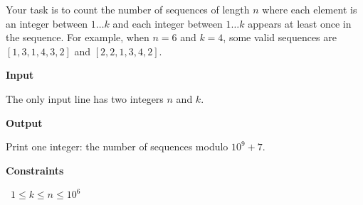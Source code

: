 Your task is to count the number of sequences of length $n$ where each element is an integer between $1 \dots k$ and each integer between $1 \dots k$ appears at least once in the sequence.
For example, when $n=6$ and $k=4$, some valid sequences are $[1,3,1,4,3,2]$ and $[2,2,1,3,4,2]$.

\vspace{0.3cm}\noindent\textbf{Input}

The only input line has two integers $n$ and $k$.

\vspace{0.3cm}\noindent\textbf{Output}

Print one integer: the number of sequences modulo $10^9+7$.

\vspace{0.3cm}\noindent\textbf{Constraints}

\textbullet\ $1 \le k \le n \le 10^6$